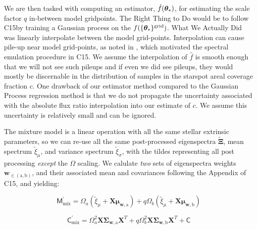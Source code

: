 \documentclass[twocolumn]{emulateapj}%
\newcommand{\iancze}{{\sc C15}}
\begin{document}
We are then tasked with computing an estimator, $\hat f({\bm \theta}_{\ast})$, for estimating the scale factor $q$ in-between model gridpoints.  The Right Thing to Do would be to follow \iancze by training a Gaussian process on the $f(\{{\bm \theta}_{\ast}\}^\textrm{grid})$.  What We Actually Did was linearly interpolate between the model grid-points.  Interpolation can cause pile-up near model grid-points, as noted in \citet{cottaar14}, which motivated the spectral emulation procedure in \iancze.  We assume the interpolation of $\hat f$ is smooth enough that we will not see such pileups and if even we did see pileups, they would mostly be discernable in the distribution of samples in the starspot areal coverage fraction $c$.  One drawback of our estimator method compared to the Gaussian Process regression method is that we do not propagate the uncertainty associated with the absolute flux ratio interpolation into our estimate of $c$.  We assume this uncertainty is relatively small and can be ignored.

The mixture model is a linear operation with all the same stellar extrinsic parameters, so we can re-use all the same post-processed eigenspectra $\widetilde{\mathbf{\Xi}}$, mean spectrum $\widetilde{\xi}_\mu$, and variance spectrum $\widetilde{\xi}_\sigma$, with the tildes representing all post processing \emph{except} the $\Omega$ scaling.  We calulate \emph{two} sets of eigenspectra weights $\mathbf{w}_{\in (\mathrm{a}, \mathrm{b})}$, and their associated mean and covariances following the Appendix of \iancze, and yielding:

\begin{equation}
  \mathsf{M}_{\mathrm{mix}}^\prime = \Omega_a (\widetilde{\xi}_\mu + \mathbf{X} \mathbf{\mu}_{\mathbf{w}, \mathrm{a}}) + q \Omega_b (\widetilde{\xi}_\mu + \mathbf{X} \mathbf{\mu}_{\mathbf{w}, \mathrm{b}})
\end{equation}

\begin{equation}
  \mathsf{C}_{\mathrm{mix}}^\prime = \Omega_a^2 \mathbf{X} \mathbf{\Sigma}_\mathbf{w, \mathrm{a}} \mathbf{X}^T + q \Omega_b^2 \mathbf{X} \mathbf{\Sigma}_\mathbf{w, \mathrm{b}} \mathbf{X}^T + \mathsf{C}
  \label{eqn:modC}
\end{equation}
\end{document}
